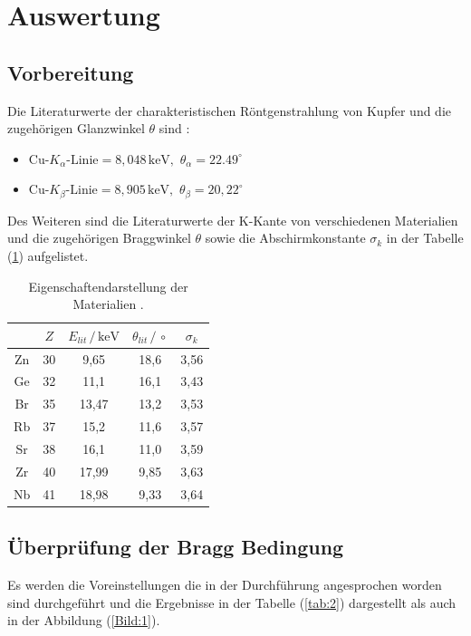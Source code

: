 \section{Auswertung}
\subsection{Vorbereitung}
Die Literaturwerte der charakteristischen Röntgenstrahlung von Kupfer und die zugehörigen
Glanzwinkel $\theta$ sind \cite{2}:
\begin{itemize}
  \item $\text{Cu-}K_\alpha \text{-Linie} = 8,048 \,\text{keV} , \, \, \theta_\alpha = 22.49^\circ$
  \item $\text{Cu-}K_\beta \text{-Linie} = 8,905 \,\text{keV} , \, \, \theta_\beta = 20,22^\circ$

\end{itemize}

Des Weiteren sind die Literaturwerte der K-Kante von verschiedenen Materialien und die zugehörigen
Braggwinkel $\theta$ sowie die Abschirmkonstante $\sigma_k$ in der Tabelle (\ref{tab:1}) aufgelistet.
\begin{table}
  \centering
  \caption{Eigenschaftendarstellung der Materialien \cite{3}.}
  \label{tab:1}
  \begin{tabular}{c c c c c}
    \toprule
     & $Z$ & $E_{lit}\,/ \, \text{keV}$ &$\theta_{lit}\,/\,\circ$ & $\sigma_k$ \\
    \midrule
    Zn & 30 & 9,65  &  18,6 & 3,56 \\
    Ge & 32 & 11,1  &  16,1 & 3,43 \\
    Br & 35 & 13,47 &  13,2 & 3,53 \\
    Rb & 37 & 15,2  &  11,6 & 3,57 \\
    Sr & 38 & 16,1  &  11,0 & 3,59 \\
    Zr & 40 & 17,99 &  9,85 & 3,63 \\
    Nb & 41 & 18,98 &  9,33 & 3,64 \\
    \bottomrule
  \end{tabular}
\end{table}

\subsection{Überprüfung der Bragg Bedingung}
Es werden die Voreinstellungen die in der Durchführung angesprochen worden sind
durchgeführt und die Ergebnisse in der Tabelle (\ref{tab:2})
dargestellt als auch in der Abbildung (\ref{Bild:1}).

